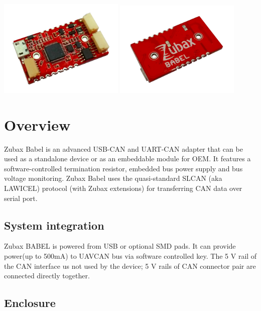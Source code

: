 \documentclass{zubaxdoc}
\begin{document}
\begin{titlepage}
\centering
\includegraphics[width=0.45\textwidth]{top}
\includegraphics[width=0.45\textwidth]{bottom}

\end{titlepage}

\tableofcontents
\BeginRightColumn
\listoffigures
\listoftables

\mainmatter

\chapter{Overview}

Zubax Babel is an advanced USB-CAN and UART-CAN adapter that can be used as a standalone device or as an embeddable module for OEM. It features a software-controlled termination resistor, embedded bus power supply and bus voltage monitoring. Zubax Babel uses the quasi-standard SLCAN (aka LAWICEL) protocol (with Zubax extensions) for transferring CAN data over serial port.

\section{System integration}

Zubax BABEL is powered from USB or optional SMD pads. It can provide power(up to 500mA) to UAVCAN bus via software controlled key.  
The 5 V rail of the CAN interface us not used by the device; 5 V rails of CAN connector pair are connected directly together.

\section{Enclosure}\label{sec:enclosure}
\end{document}
